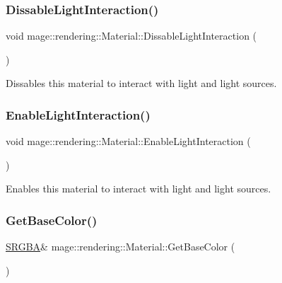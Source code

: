 \subsubsection{\texorpdfstring{Dissable\+Light\+Interaction()}{DissableLightInteraction()}}
{\footnotesize\ttfamily void mage\+::rendering\+::\+Material\+::\+Dissable\+Light\+Interaction (\begin{DoxyParamCaption}{ }\end{DoxyParamCaption})\hspace{0.3cm}{\ttfamily [noexcept]}}

Dissables this material to interact with light and light sources. \hypertarget{classmage_1_1rendering_1_1_material_a6cacaf988bf34a619c701d6fcd693322}{}\label{classmage_1_1rendering_1_1_material_a6cacaf988bf34a619c701d6fcd693322} 
\subsubsection{\texorpdfstring{Enable\+Light\+Interaction()}{EnableLightInteraction()}}
{\footnotesize\ttfamily void mage\+::rendering\+::\+Material\+::\+Enable\+Light\+Interaction (\begin{DoxyParamCaption}{ }\end{DoxyParamCaption})\hspace{0.3cm}{\ttfamily [noexcept]}}

Enables this material to interact with light and light sources. \hypertarget{classmage_1_1rendering_1_1_material_a3b5c99673752acd11758cc0ebab3f68a}{}\label{classmage_1_1rendering_1_1_material_a3b5c99673752acd11758cc0ebab3f68a} 
\subsubsection{\texorpdfstring{Get\+Base\+Color()}{GetBaseColor()}\hspace{0.1cm}{\footnotesize\ttfamily [1/2]}}
{\footnotesize\ttfamily \hyperlink{structmage_1_1_s_r_g_b_a}{S\+R\+G\+BA}\& mage\+::rendering\+::\+Material\+::\+Get\+Base\+Color (\begin{DoxyParamCaption}{ }\end{DoxyParamCaption})\hspace{0.3cm}{\ttfamily [noexcept]}}

